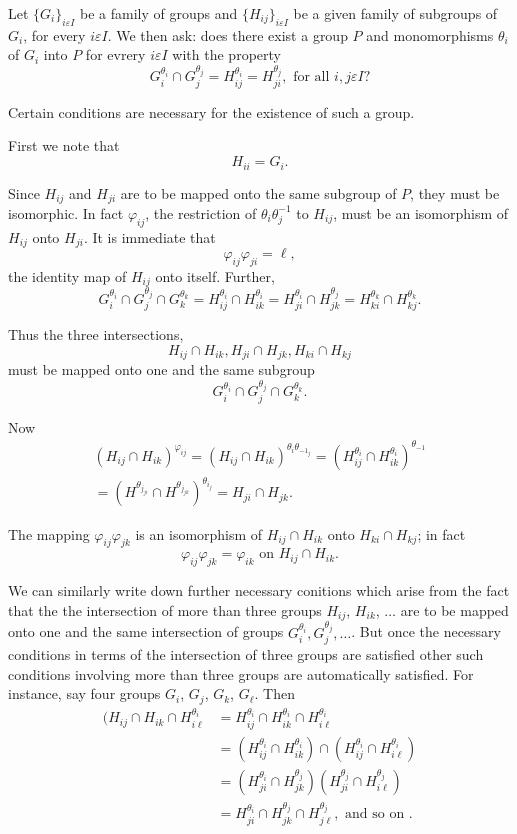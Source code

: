 Let $\big\{ G_i \big \}_{i \varepsilon I}$ be a family of groups and
$\big\{ H_{i j} \big \}_{i \varepsilon I}$ be a given family of
subgroups of $G_i$, for every $i \varepsilon I$. We then ask: does
there exist a group $P$ and monomorphisms $\theta_i$ of $G_i$ into $P$
for evrery $i \varepsilon I$ with the property 
$$
G^{\theta_i}_i \cap G_j^{\theta_j} = H^{\theta_i}_{ij} =
H^{\theta_j}_{ji}, \text{ for all } i,j \varepsilon I? 
$$

Certain conditions are necessary for the existence of such a group.

First we note that 
$$
H_{i i} = G_i.
$$

Since $H_{ij}$ and $H_{ji}$ are to be mapped onto the same subgroup of
$P$, they must be isomorphic. In fact $\varphi_{ij}$, the restriction
of $\theta_i \theta_j^{-1}$ to $H_{ij}$, must be an isomorphism of
$H_{ij}$ onto $H_{ji}$. It is immediate that  
$$
\varphi_{ij} \varphi_{ji} = \ell,
$$
the identity map of $H_{ij}$ onto itself. Further,
$$
G^{\theta_i}_i \cap G_j^{\theta_j} \cap G^{\theta_k}_k =
H^{\theta_i}_{ij} \cap H^{\theta_i}_{ik} = H^{\theta_i}_{ji} \cap
H^{\theta_j}_{jk} = H^{\theta_k}_{ki} \cap H^{\theta_k}_{kj}. 
$$

Thus the three intersections,
$$
H_{ij} \cap H_{ik}, H_{ji} \cap H_{jk}, H_{ki} \cap H_{kj}
$$
must be mapped onto one and the same subgroup
$$
G^{\theta_i}_i \cap G^{\theta_j}_j \cap G^{\theta_k}_k.
$$

Now
\begin{multline*}
  (H_{ij} \cap H_{ik})^{\varphi_{ij}} =(H_{ij} \cap H_{ik})^{\theta_i
    \theta_{{-1}_j}}= (H^{\theta_i}_{ij} \cap
  H^{\theta_i}_{ik})^{\theta_{-1}}\\ 
  = (H^{\theta_{j_{ji}}} \cap
  H^{\theta_{j_{jk}}})^{\theta_{i_j}} =  H_{ji} \cap H_{jk}. 
\end{multline*}

The mapping $\varphi_{ij} \varphi_{jk}$ is an isomorphism of $H_{ij}
\cap H_{ik}$ onto $H_{ki} \cap H_{kj}$; in fact 
$$
\varphi_{ij} \varphi_{jk} = \varphi_{ik} \text{ on } H_{ij} \cap H_{ik}.
$$

We can similarly write down further necessary conitions which arise
from the fact that the the intersection of more than three groups
$H_{ij}$, $H_{ik}$, $\ldots$ are to be mapped onto one and the same
intersection of groups $G^{\theta_i}_i,  G^{\theta_j}_j, \ldots $. But
once the necessary conditions in terms of the intersection of three
groups are satisfied other such conditions involving more than three
groups are automatically satisfied. For instance, say four groups
$G_i$, $G_j$, $G_k$, $G_{\ell}$. Then  
\begin{align*}
  (H_{ij} \cap H_{ik} \cap H_{ i \ell}^{\theta_i} &= H^{\theta_i}_{ij}
  \cap H^{{\theta_i}}_{ik} \cap H^{{\theta_i}}_{i \ell} \\
  &= (H^{\theta_i}_{ij} \cap H^{\theta_i}_{ik}) \cap
  (H^{\theta_i}_{ij} \cap H^{\theta_i}_{i \ell})\\ 
  &=(H^{\theta_i}_{ji} \cap H^{\theta_j}_{jk})  (H^{\theta_j}_{ji}
  \cap H^{\theta_j}_{i \ell})\\ 
  & = H^{\theta_i}_{ji} \cap H^{\theta_j}_{jk} \cap H^{\theta_j}_{j
    \ell}, \text{ and so on }. 
\end{align*}

